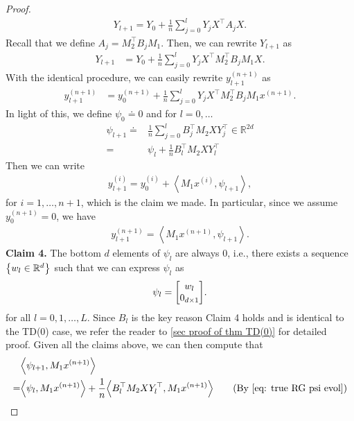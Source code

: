\documentclass{article}
\newcommand{\explain}[1]{\tag*{(#1)}}
\newcommand{\R}{\mathbb{R}}
\newcommand{\indot}[2]{{\left<#1, #2\right>}}
\begin{document}
\begin{proof}
    \begin{align}
        Y_{l+1} = Y_0 + \frac{1}{n}\sum_{j=0}^l Y_j X^\top A_j X.
    \end{align}
    Recall that we define $A_j = M_2^\top B_j M_1$.
    Then, we can rewrite $Y_{l+1}$ as
    \begin{align}
        Y_{l+1}
        &= Y_0 + \frac{1}{n} \sum_{j=0}^l Y_j X^\top M_2^\top B_j M_1 X.
    \end{align}
    With the identical procedure, we can easily rewrite $y_{l+1}^{(n+1)}$ as
    \begin{align}
        y_{l+1}^{(n+1)} &= y_0^{(n+1)} + \frac{1}{n} \sum_{j=0}^l Y_j X^\top M_2^\top B_j M_1 x^{(n+1)}.
    \end{align}
    In light of this,
    we define $\psi_0 \doteq 0$ and for $l = 0, \dots$
    \begin{align}
      \psi_{l+1}
      \doteq & \frac{1}{n}\sum_{j=0}^l B_j^\top M_2 X Y_j^\top \in \R^{2d}\\
      = & \psi_l + \frac{1}{n} B_l^\top M_2 X Y_l^\top \label{eq: true RG psi evol}
    \end{align}
    Then we can write
    \begin{align}
        y_{l+1}^{(i)} = y_0^{(i)} + \indot{M_1 x^{(i)}}{\psi_{l+1}}, \label{eq: y_l+1 evol psi true RG}
    \end{align}
    for $i=1, \dots, n+1$, which is the claim we made.
    In particular, since we assume $y_0^{(n+1)} = 0$, we have
    \begin{align}
      y_{l+1}^{(n+1)} = \indot{M_1 x^{(n+1)}}{\psi_{l+1}}.
    \end{align}
    \textbf{Claim 4.} The bottom $d$ elements of $\psi_l$ are always 0, i.e., there exists a sequence $\qty{w_l \in \R^d}$ such that we can express $\psi_l$ as
    \begin{align}
        \psi_l = \mqty[w_l \\ 0_{d \times 1}].
    \end{align}
    for all $l = 0,1,\dots, L$.
    Since $B_l$ is the key reason Claim 4 holds and is identical to the TD(0) case, we refer the reader to \ref{sec proof of thm TD(0)} for detailed proof.
     Given all the claims above,
    we can then compute that
    \begin{align}
        &\indot{\psi_{l+1}}{M_1 x^{(n+1)}}\\
        =&\indot{\psi_l}{M_1 x^{(n+1)}} + \frac{1}{n}\indot{B_l^\top M_2 X Y_l^\top}{M_1 x^{(n+1)}} \explain{By~\eqref{eq: true RG psi evol}}\\

\end{align}
\end{proof}
\end{document}
